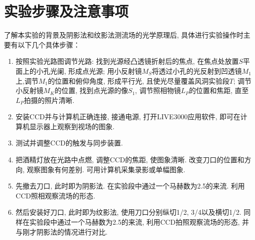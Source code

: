 \documentclass[12pt,a4paper,boxed,titlepage]{caspset}
\begin{document}
\section{实验步骤及注意事项}
了解本实验的背景及阴影法和纹影法测流场的光学原理后, 具体进行实验操作时主要有以下几个具体步骤：
\begin{enumerate}
\item 按照实验光路图调节光路: 找到光源经凸透镜折射后的焦点, 在焦点处放置$S$平面上的小孔光阑, 形成点光源; 用小反射镜$M_S$将透过小孔的光反射到凹透镜$M_1$上,调节$M_1$的位置和俯仰角度, 形成平行光, 且使光尽量覆盖风洞实验段$T$; 调节小反射镜$M_K$的位置, 找到点光源的像$S_1$, 调节照相物镜$L_P$的位置和焦距, 直至$L_P$拍摄的照片清晰.
\item 安装CCD并与计算机正确连接, 接通电源, 打开LIVE3000应用软件, 即可在计算机显示器上观察到视场的图象.
\item 测试并调整CCD的触发与同步装置.
\item	把酒精灯放在光路中点燃, 调整CCD的焦距, 使图象清晰. 改变刀口的位置和方向, 观察图象有何差别. 可用计算机采集录影或单幅图象.
\item 先撤去刀口, 此时即为阴影法. 在实验段中通过一个马赫数为2.5的来流. 利用CCD照相观察流场的形态.	
\item 然后安装好刀口, 此时即为纹影法, 使用刀口分别纵切1/2, 3/4以及横切1/2. 同样在实验段中通过一个马赫数为2.5的来流, 利用CCD拍照观察流场的形态, 并与刚才阴影法的情况进行对比.
\end{enumerate}
\end{document}
